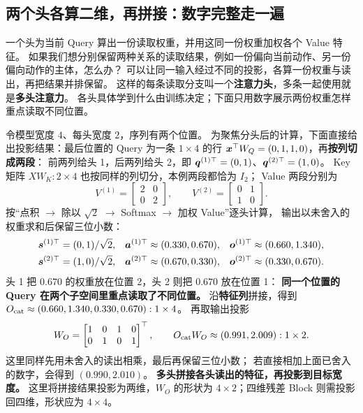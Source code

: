 \subsection{两个头各算二维，再拼接：数字完整走一遍}
\label{concept:multihead}

一个头为当前 Query 算出一份读取权重，并用这同一份权重加权各个 Value 特征。
如果我们想分别保留两种关系的读取结果，例如一份偏向当前动作、另一份偏向动作的主体，怎么办？
可以让同一输入经过不同的投影，各算一份权重与读出，再把结果并排保留。
这样的每条读取分支叫一个\textbf{注意力头}，多条一起使用就是\textbf{多头注意力}。
各头具体学到什么由训练决定；下面只用数字展示两份权重怎样重点读取不同位置。

令模型宽度 $4$、每头宽度 $2$，序列有两个位置。
为聚焦分头后的计算，下面直接给出投影结果：最后位置的 Query 为一条 $1\times4$ 的行
$\boldsymbol{x}^\top W_Q=(0,1,1,0)$，再\textbf{按列切成两段}：
前两列给头 1，后两列给头 2，即
$\boldsymbol{q}^{(1)\top}=(0,1)$、$\boldsymbol{q}^{(2)\top}=(1,0)$。
Key 矩阵 $XW_K:2\times4$ 也按同样的列切分，本例两段都恰为 $I_2$；
Value 两段分别为
\[
V^{(1)}=\begin{bmatrix}2&0\\0&2\end{bmatrix},
\qquad
V^{(2)}=\begin{bmatrix}0&1\\1&0\end{bmatrix}.
\]
按“点积 $\to$ 除以 $\sqrt2$ $\to$ Softmax $\to$ 加权 Value”逐头计算，
输出以未舍入的权重求和后保留三位小数：
\[
\begin{aligned}
\boldsymbol{s}^{(1)\top}&=(0,1)/\sqrt2,&
\boldsymbol{a}^{(1)\top}&\approx(0.330,0.670),&
\boldsymbol{o}^{(1)\top}&\approx(0.660,1.340),\\
\boldsymbol{s}^{(2)\top}&=(1,0)/\sqrt2,&
\boldsymbol{a}^{(2)\top}&\approx(0.670,0.330),&
\boldsymbol{o}^{(2)\top}&\approx(0.330,0.670).
\end{aligned}
\]
头 1 把 $0.670$ 的权重放在位置 2，头 2 则把 $0.670$ 放在位置 1：
\textbf{同一个位置的 Query 在两个子空间里重点读取了不同位置。}
沿\textbf{特征列}拼接，得到
$O_{\rm cat}\approx(0.660,1.340,0.330,0.670):1\times4$。
再取输出投影
\[
W_O=\begin{bmatrix}1&0&1&0\\0&1&0&1\end{bmatrix}^{\top},
\qquad O_{\rm cat}W_O\approx(0.991,2.009):1\times2.
\]
这里同样先用未舍入的读出相乘，最后再保留三位小数；
若直接相加上面已舍入的数字，会得到 $(0.990,2.010)$。
\textbf{多头拼接各头读出的特征，再投影到目标宽度。}
这里将拼接结果投影为两维，$W_O$ 的形状为 $4\times2$；四维残差 Block 则需投影回四维，形状应为 $4\times4$。

